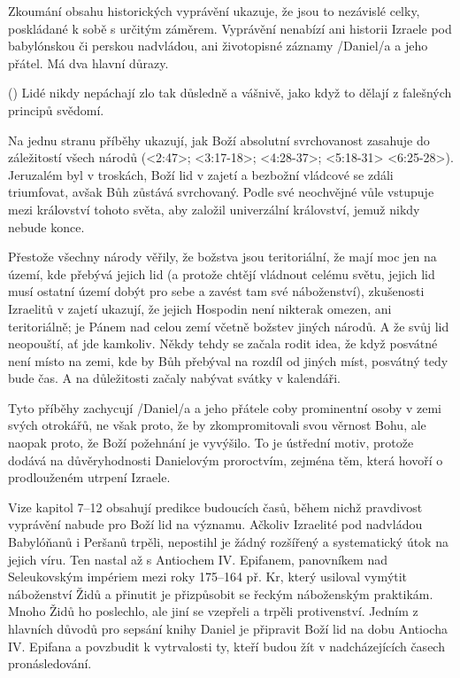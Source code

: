 Zkoumání obsahu historických vyprávění ukazuje, že jsou to nezávislé celky, poskládané k sobě s určitým záměrem.
Vyprávění nenabízí ani historii Izraele pod babylónskou či perskou nadvládou, ani životopisné záznamy \x/Daniel/a a jeho přátel. Má dva hlavní důrazy.

 (\kern-2mm) {
Lidé nikdy nepáchají zlo tak důsledně a vášnivě,
jako když to dělají z falešných principů svědomí.
}

Na jednu stranu příběhy ukazují, jak Boží absolutní svrchovanost zasahuje do záležitostí všech národů 
(<2:47>; <3:17-18>; <4:28-37>; <5:18-31> <6:25-28>).
Jeruzalém byl v troskách, Boží lid v zajetí a bezbožní vládcové se zdáli triumfovat, avšak Bůh zůstává svrchovaný.
Podle své neochvějné vůle vstupuje mezi království tohoto světa, aby založil univerzální království, jemuž nikdy nebude konce.

Přestože všechny  národy věřily, že božstva jsou teritoriální, že mají moc jen na území, kde přebývá jejich lid (a protože chtějí vládnout celému světu, jejich lid musí ostatní území dobýt pro sebe a zavést tam své náboženství), zkušenosti Izraelitů v zajetí ukazují, že jejich Hospodin není nikterak omezen, ani teritoriálně; je Pánem nad celou zemí včetně božstev jiných národů. A že svůj lid neopouští, ať jde kamkoliv. Někdy tehdy se začala rodit idea, že  když posvátné není místo na zemi, kde by Bůh přebýval na rozdíl od jiných míst, posvátný tedy bude čas. A na důležitosti začaly nabývat svátky v kalendáři. %

Tyto příběhy zachycují \x/Daniel/a a jeho přátele coby prominentní osoby v zemi svých otrokářů, ne však proto, že by zkompromitovali svou věrnost Bohu, ale naopak proto, že Boží požehnání je vyvýšilo.
To je ústřední motiv, protože dodává na důvěryhodnosti Danielovým proroctvím, zejména těm, která hovoří o prodlouženém utrpení Izraele. 

Vize kapitol 7--12 obsahují predikce budoucích časů, během nichž pravdivost vyprávění nabude pro Boží lid na významu.
Ačkoliv Izraelité pod nadvládou Babylóňanů i Peršanů trpěli, nepostihl je žádný rozšířený a systematický útok na jejich víru. Ten nastal až s Antiochem IV. Epifanem, panovníkem nad Seleukovským impériem mezi roky 175--164 př. Kr, který usiloval vymýtit náboženství Židů a přinutit je přizpůsobit se řeckým náboženským praktikám. Mnoho Židů ho poslechlo, ale jiní se vzepřeli a trpěli protivenství. 
Jedním z hlavních důvodů pro sepsání knihy Daniel je připravit Boží lid na dobu Antiocha IV. Epifana a povzbudit k vytrvalosti ty, kteří budou žít v nadcházejících časech pronásledování.


